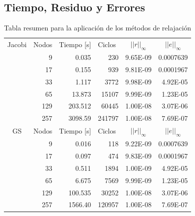 \documentclass[letter,10pt]{article}
\begin{document}
\subsection{Tiempo, Residuo y Errores}

\begin{table}[H]
\centering
\caption{Tabla resumen para la aplicación de los métodos de relajación}
\begin{tabular}[t]{|l|r|r|r|r|r|}
\hline
\multicolumn{ 1}{|c|}{Jacobi} & \multicolumn{1}{l|}{Nodos} & \multicolumn{1}{l|}{Tiempo [s]}& \multicolumn{1}{l|}{Ciclos} & \multicolumn{1}{c|}{$||r||_{\infty}$} & \multicolumn{1}{c|}{$||e||_{\infty}$} \\ \cline{ 2- 6}
\multicolumn{ 1}{|l|}{} &9 & 0.035& 230 & 9.65E-09 & 0.0007639 \\ \cline{ 2- 6}
\multicolumn{ 1}{|l|}{} & 17 & 0.155 & 939 &9.81E-09 & 0.0001967 \\ \cline{ 2- 6}
\multicolumn{ 1}{|l|}{} & 33 & 1.117 & 3772 &9.98E-09 & 4.92E-05 \\ \cline{ 2- 6}
\multicolumn{ 1}{|l|}{} & 65 & 13.873 &15107&9.99E-09 & 1.23E-05 \\ \cline{ 2- 6}
\multicolumn{ 1}{|l|}{} & 129 & 203.512 &60445 &1.00E-08 & 3.07E-06 \\ \cline{ 2- 6}
\multicolumn{ 1}{|l|}{} & 257 & 3098.59 & 241797 & 1.00E-08 &7.69E-07 \\ \hline

\multicolumn{ 1}{|c|}{GS} & \multicolumn{1}{l|}{Nodos} & \multicolumn{1}{l|}{Tiempo [s]}& \multicolumn{1}{l|}{Ciclos} & \multicolumn{1}{c|}{$||r||_{\infty}$} & \multicolumn{1}{c|}{$||e||_{\infty}$} \\ \cline{ 2- 6}
\multicolumn{ 1}{|l|}{} &9 & 0.016& 118 & 9.22E-09 & 0.0007639 \\ \cline{ 2- 6}
\multicolumn{ 1}{|l|}{} & 17 & 0.097 & 474 &9.83E-09 & 0.0001967 \\ \cline{ 2- 6}
\multicolumn{ 1}{|l|}{} & 33 & 0.511 & 1894 &1.00E-09 & 4.92E-05 \\ \cline{ 2- 6}
\multicolumn{ 1}{|l|}{} & 65 & 6.675&7569 & 9.99E-09 & 1.23E-05 \\ \cline{ 2- 6}
\multicolumn{ 1}{|l|}{} & 129 & 100.535& 30252 & 1.00E-08 & 3.07E-06 \\ \cline{ 2- 6}
\multicolumn{ 1}{|l|}{} & 257 & 1566.40& 120957 & 1.00E-08 & 
7.69E-07 \\ \hline


\end{tabular}
\end{table}
\end{document}
